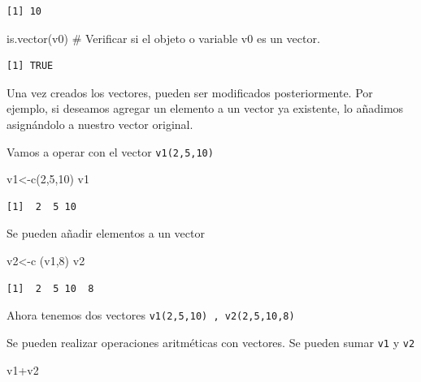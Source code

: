 \documentclass[
  letterpaper,
]{scrbook}
\newenvironment{Shaded}{\begin{snugshade}}{\end{snugshade}}
\newcommand{\CommentTok}[1]{\textcolor[rgb]{0.37,0.37,0.37}{#1}}
\newcommand{\DecValTok}[1]{\textcolor[rgb]{0.68,0.00,0.00}{#1}}
\newcommand{\FunctionTok}[1]{\textcolor[rgb]{0.28,0.35,0.67}{#1}}
\newcommand{\NormalTok}[1]{\textcolor[rgb]{0.00,0.23,0.31}{#1}}
\newcommand{\OtherTok}[1]{\textcolor[rgb]{0.00,0.23,0.31}{#1}}
\newcommand{\SpecialCharTok}[1]{\textcolor[rgb]{0.37,0.37,0.37}{#1}}
\begin{document}
\begin{verbatim}
[1] 10
\end{verbatim}

\begin{Shaded}
\begin{Highlighting}[]
\FunctionTok{is.vector}\NormalTok{(v0) }\CommentTok{\# Verificar si el objeto o variable \textquotesingle{}v0\textquotesingle{} es un vector.}
\end{Highlighting}
\end{Shaded}

\begin{verbatim}
[1] TRUE
\end{verbatim}

Una vez creados los vectores, pueden ser modificados posteriormente. Por
ejemplo, si deseamos agregar un elemento a un vector ya existente, lo
añadimos asignándolo a nuestro vector original.

Vamos a operar con el vector \texttt{v1(2,5,10)}

\begin{Shaded}
\begin{Highlighting}[]
\NormalTok{v1}\OtherTok{\textless{}{-}}\FunctionTok{c}\NormalTok{(}\DecValTok{2}\NormalTok{,}\DecValTok{5}\NormalTok{,}\DecValTok{10}\NormalTok{)}
\NormalTok{v1}
\end{Highlighting}
\end{Shaded}

\begin{verbatim}
[1]  2  5 10
\end{verbatim}

Se pueden añadir elementos a un vector

\begin{Shaded}
\begin{Highlighting}[]
\NormalTok{v2}\OtherTok{\textless{}{-}}\FunctionTok{c}\NormalTok{ (v1,}\DecValTok{8}\NormalTok{)}
\NormalTok{v2}
\end{Highlighting}
\end{Shaded}

\begin{verbatim}
[1]  2  5 10  8
\end{verbatim}

Ahora tenemos dos vectores \texttt{v1(2,5,10)\ ,\ v2(2,5,10,8)}

Se pueden realizar operaciones aritméticas con vectores. Se pueden sumar
\texttt{v1} y \texttt{v2}

\begin{Shaded}
\begin{Highlighting}[]
\NormalTok{v1}\SpecialCharTok{+}\NormalTok{v2}
\end{Highlighting}
\end{Shaded}
\end{document}
